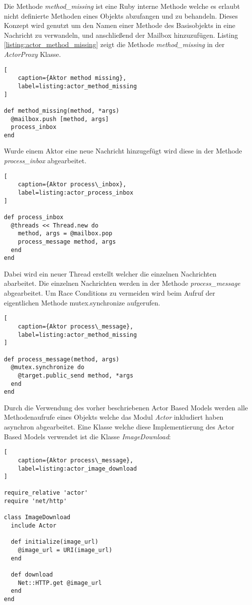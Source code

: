 Die Methode \emph{method\_missing} ist eine Ruby interne Methode welche es erlaubt nicht definierte Methoden eines Objekts abzufangen und zu behandeln. Dieses Konzept wird genutzt um den Namen einer Methode des Basisobjekts in eine Nachricht zu verwandeln, und anschließend der Mailbox hinzuzufügen. Listing \ref{listing:actor_method_missing} zeigt die Methode \emph{method\_missing} in der \emph{ActorProxy} Klasse. 

\begin{lstlisting}[
	caption={Aktor method missing},
	label=listing:actor_method_missing
]

def method_missing(method, *args)
  @mailbox.push [method, args]
  process_inbox
end
\end{lstlisting}


Wurde einem Aktor eine neue Nachricht hinzugefügt wird diese in der Methode \emph{process\_inbox} abgearbeitet. 

\begin{lstlisting}[
	caption={Aktor process\_inbox},
	label=listing:actor_process_inbox
]

def process_inbox
  @threads << Thread.new do
    method, args = @mailbox.pop
    process_message method, args
  end
end
\end{lstlisting}	

Dabei wird ein neuer Thread erstellt welcher die einzelnen Nachrichten abarbeitet. Die einzelnen Nachrichten werden in der Methode \emph{process\_message} abgearbeitet. Um Race Conditions zu vermeiden wird beim Aufruf der eigentlichen Methode mutex.synchronize aufgerufen. 


\begin{lstlisting}[
	caption={Aktor process\_message},
	label=listing:actor_method_missing
]

def process_message(method, args)
  @mutex.synchronize do
    @target.public_send method, *args
  end
end
\end{lstlisting}	

Durch die Verwendung des vorher beschriebenen Actor Based Models werden alle Methodenaufrufe eines Objekts welche das Modul \emph{Actor} inkludiert haben asynchron abgearbeitet. Eine Klasse welche diese Implementierung des Actor Based Models verwendet ist die Klasse \emph{ImageDownload}:

\begin{lstlisting}[
	caption={Aktor process\_message},
	label=listing:actor_image_download
]

require_relative 'actor'
require 'net/http'

class ImageDownload
  include Actor

  def initialize(image_url)
    @image_url = URI(image_url)
  end

  def download
    Net::HTTP.get @image_url
  end
end
\end{lstlisting}

